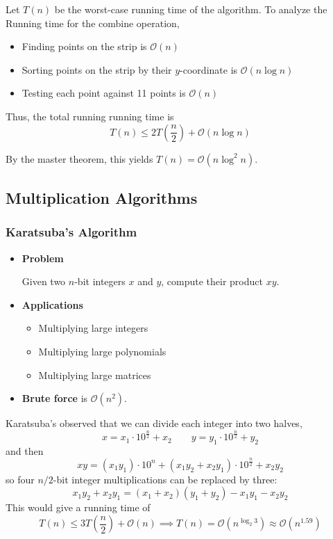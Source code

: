 Let $T(n)$ be the worst-case running time of the algorithm. To analyze the Running time for the combine operation, 
\begin{itemize}
    \item Finding points on the strip is $\mathcal{O}(n)$
    \item Sorting points on the strip by their $y$-coordinate is $\mathcal{O}(n \log n)$
    \item Testing each point against 11 points is $\mathcal{O}(n)$
\end{itemize}

Thus, the total running running time is \[
    T(n) \le 2T\left( \frac{n}{2} \right) + \mathcal{O}(n \log n)
\] 

By the master theorem, this yields $T(n) = \mathcal{O}(n \log^2 n)$.

\subsection{Multiplication Algorithms}

\subsubsection{Karatsuba's Algorithm}\label{subsubsec:karatsuba}

\begin{itemize}
    \item \textbf{Problem}
    
    Given two $n$-bit integers $x$ and $y$, compute their product $xy$.

    \item \textbf{Applications}
    
    \begin{itemize}
        \item Multiplying large integers
        \item Multiplying large polynomials
        \item Multiplying large matrices
    \end{itemize}

    \item \textbf{Brute force} is $\mathcal{O}(n^2)$.
\end{itemize}

Karatsuba's observed that we can divide each integer into two halves, \[
    x = x_1 \cdot 10^{\frac{n}{2}} + x_2  \qquad y = y_1 \cdot 10^{\frac{n}{2}} + y_2
\] and then \[
    xy = (x_1y_1) \cdot 10^n + (x_1y_2 + x_2y_1) \cdot 10^{\frac{n}{2}} + x_2y_2
\] so four $n/2$-bit integer multiplications can be replaced by three: \[
    x_1y_2 + x_2y_1 = (x_1 + x_2)(y_1 + y_2) - x_1y_1 - x_2y_2
\] This would give a running time of \[
    T(n) \le 3T\left( \frac{n}{2} \right) + \mathcal{O}(n) \implies T(n) = \mathcal{O}(n^{\log_2 3}) \approx \mathcal{O}(n^{1.59})
\]

